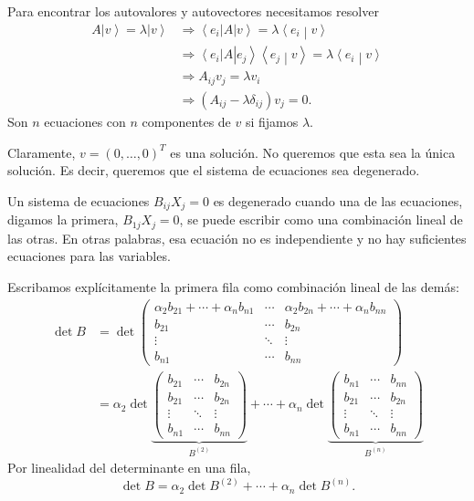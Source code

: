 \documentclass[11pt,a4paper]{article}
\newcommand{\ket}[1]{\left|#1\right\rangle}
\newcommand{\bra}[1]{\left\langle#1\right|}
\newcommand{\braket}[2]{\left\langle #1\middle|#2\right\rangle}
\begin{document}
Para encontrar los autovalores y autovectores necesitamos resolver
\begin{align*}
  A\ket v=\lambda\ket v
  &\Longrightarrow \bra{e_i}A\ket v=\lambda\braket{e_i}{v}\\
  &\Longrightarrow \bra{e_i}A\ket{e_j}\braket{e_j}{v}
     =\lambda\braket{e_i}{v}\\
  &\Longrightarrow A_{ij}v_j=\lambda v_i\\
  &\Longrightarrow (A_{ij}-\lambda\delta_{ij})v_j=0.
\end{align*}
Son $n$ ecuaciones con $n$ componentes de $v$ si fijamos $\lambda$.

Claramente, $v=(0,\ldots,0)^T$ es una solución. No queremos que esta sea la única solución. Es decir, queremos que el sistema de ecuaciones sea degenerado.

Un sistema de ecuaciones $B_{ij}X_j=0$ es degenerado cuando una de las ecuaciones, digamos la primera, $B_{1j}X_j=0$, se puede escribir como una combinación lineal de las otras. En otras palabras, esa ecuación no es independiente y no hay suficientes ecuaciones para las variables.

Escribamos explícitamente la primera fila como combinación lineal de las demás:
\begin{align}
\det B &=\det
\begin{pmatrix}
 \alpha_2b_{21}+\cdots+\alpha_nb_{n1} & \cdots &
 \alpha_2b_{2n}+\cdots+\alpha_nb_{nn}\\
 b_{21}&\cdots&b_{2n}\\
 \vdots&\ddots&\vdots\\
 b_{n1}&\cdots&b_{nn}
\end{pmatrix} \\
&=\alpha_2\det
\underbrace{\begin{pmatrix}
 b_{21}&\cdots&b_{2n}\\
 b_{21}&\cdots&b_{2n}\\
 \vdots&\ddots&\vdots\\
 b_{n1}&\cdots&b_{nn}
\end{pmatrix}}_{B^{(2)}}
+\cdots+
\alpha_n\det
\underbrace{\begin{pmatrix}
 b_{n1}&\cdots&b_{nn}\\
 b_{21}&\cdots&b_{2n}\\
 \vdots&\ddots&\vdots\\
 b_{n1}&\cdots&b_{nn}
\end{pmatrix}}_{B^{(n)}}
\end{align}
Por linealidad del determinante en una fila,
\[
  \det B=\alpha_2\det B^{(2)}+\cdots+\alpha_n\det B^{(n)}.
\]
\end{document}
